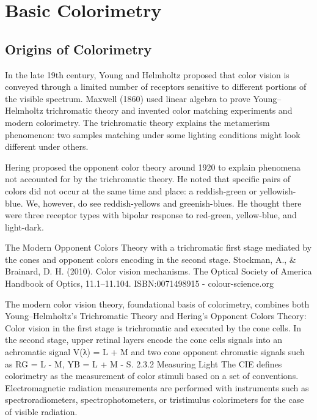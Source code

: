 \section{Basic Colorimetry}%
\label{sec:basic-colorimetry}

\subsection{Origins of Colorimetry}%
\label{subsec:origins-of-colorimetry}

In the late 19th century, Young and Helmholtz proposed that color vision is conveyed through a limited number of receptors sensitive to different portions of the visible spectrum. Maxwell (1860) used linear algebra to prove Young–Helmholtz trichromatic theory and invented color matching experiments and modern colorimetry. The trichromatic theory explains the metamerism phenomenon: two samples matching under some lighting conditions might look different under others.


Hering proposed the opponent color theory around 1920 to explain phenomena not accounted for by the trichromatic theory. He noted that specific pairs of colors did not occur at the same time and place: a reddish-green or yellowish-blue. We, however, do see reddish-yellows and greenish-blues. He thought there were three receptor types with bipolar response to red-green, yellow-blue, and light-dark.

The Modern Opponent Colors Theory with a trichromatic first stage mediated by the cones and opponent colors encoding in the second stage. Stockman, A., & Brainard, D. H. (2010). Color vision mechanisms. The Optical Society of America Handbook of Optics, 11.1–11.104. ISBN:0071498915 - colour-science.org

The modern color vision theory,  foundational basis of colorimetry, combines both Young–Helmholtz's Trichromatic Theory and Hering’s Opponent Colors Theory: Color vision in the first stage is trichromatic and executed by the cone cells. In the second stage, upper retinal layers encode the cone cells signals into an achromatic signal V(λ) = L + M and two cone opponent chromatic signals such as RG = L - M, YB = L + M - S.
2.3.2 Measuring Light
The CIE defines colorimetry as the measurement of color stimuli based on a set of conventions. Electromagnetic radiation measurements are performed with instruments such as spectroradiometers, spectrophotometers, or tristimulus colorimeters for the case of visible radiation.

